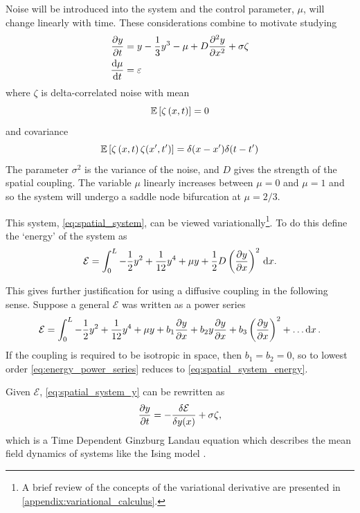 Noise will be introduced into the system and the control parameter, $\mu$,  will change linearly with time. These considerations combine to motivate studying
\begin{subequations}
\label{eq:spatial_system}
  \begin{align}
    \pdv{y}{t} &= y - \frac{1}{3}y^3 - \mu + D\pdv[2]{y}{x} + \sigma\zeta \label{eq:spatial_system_y} \\
    \dv{\mu}{t}&= \varepsilon \label{eq:spatial_system_mu}
  \end{align}
\end{subequations}
where $\zeta$ is delta-correlated noise with mean
\begin{equation}
  \label{eq:delta_mean}
  \operatorname*{\mathbb{E}} \left[\zeta\left(x,t\right)\right] = 0 
\end{equation}
and covariance
\begin{equation}
  \label{eq:delta_cov}
  \operatorname*{\mathbb{E}} \left[\zeta\left(x,t\right)\zeta(x',t')\right] = \delta(x-x')\delta(t-t') 
\end{equation}
The parameter $\sigma^2$ is the variance of the noise, and $D$ gives the strength of the spatial coupling.
The variable $\mu$ linearly increases between $\mu = 0$ and $\mu = 1$ and so the system will undergo a saddle node bifurcation at $\mu = 2/3$.

This system, \cref{eq:spatial_system}, can be viewed variationally\footnote{A brief review of the concepts of the variational derivative are presented in \cref{appendix:variational_calculus}.}.
To do this define the `energy' of the system as
\begin{equation}
  \label{eq:spatial_system_energy}
  \mathcal{E} = \int_0^L -\frac{1}{2}y^2 + \frac{1}{12}y^4 + \mu y + \frac{1}{2}D\left(\pdv{y}{x}\right)^2\,\mathrm{d}{x}.
\end{equation}

This gives further justification for using a diffusive coupling in the following sense. Suppose a general $\mathcal{E}$ was written as a power series
\begin{equation}
  \label{eq:energy_power_series}
  \mathcal{E} = \int_0^L  -\frac{1}{2}y^2 + \frac{1}{12}y^4 + \mu y + b_1 \pdv{y}{x} + b_2 y \pdv{y}{x} + b_3 \left(\pdv{y}{x}\right)^2 + \ldots \dd{x}.
\end{equation}
If the coupling is required to be isotropic in space, then $b_1 = b_2 = 0$, so to lowest order \cref{eq:energy_power_series} reduces to
\cref{eq:spatial_system_energy}.

Given $\mathcal{E}$, \cref{eq:spatial_system_y} can be rewritten as
\begin{equation}
  \label{eq:spatial_system_y_variational}
    \pdv{y}{t} = -\fdv{\mathcal{E}}{y(x)}  + \sigma\zeta, 
\end{equation}
which is a Time Dependent Ginzburg Landau equation which describes the mean field dynamics of systems like the Ising model \parencite{Goldenfeld1992}.


